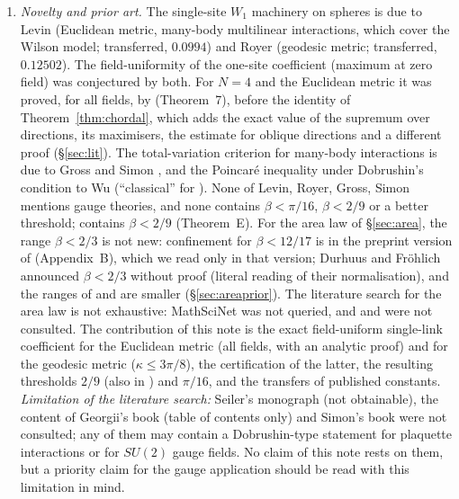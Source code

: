 \documentclass[11pt,a4paper]{article}
\theoremstyle{remark}
\theoremstyle{definition}
\theoremstyle{plain}
\theoremstyle{remark}
\begin{document}
\begin{enumerate}
This is not a refereeing: neither certificate, and none of the proofs, has been audited or refereed by a party outside the project, and the new proofs (\S\ref{sec:chordal}, \S\ref{sec:area}) have not been read by a human referee.
\item \emph{Novelty and prior art.} The single-site $W_1$ machinery on spheres is due to Levin \cite{Lev80}
(Euclidean metric, many-body multilinear interactions, which cover the Wilson model; transferred, $0.0994$)
and Royer \cite{Roy86} (geodesic metric; transferred, $0.12502$). The field-uniformity of the one-site
coefficient (maximum at zero field) was conjectured by both. For $N=4$ and the Euclidean metric it was proved, for all fields, by \cite{BB26} (Theorem~7),
before the identity of Theorem~\ref{thm:chordal}, which adds the exact value of the supremum over directions, its maximisers, the estimate for oblique directions and a different proof (\S\ref{sec:lit}).
The total-variation criterion for many-body interactions is due to Gross \cite{Gro79} and Simon \cite{Sim79}, and the Poincar\'e inequality under Dobrushin's condition to Wu \cite{Wu06} (``classical'' for \cite{BB26}).
None of Levin, Royer, Gross, Simon mentions gauge theories, and none contains $\beta<\pi/16$, $\beta<2/9$ or a better threshold; \cite{BB26} contains $\beta<2/9$ (Theorem~E).
For the area law of \S\ref{sec:area}, the range $\beta<2/3$ is not new: confinement for $\beta<12/17$ is in the preprint version of \cite{BS83} (Appendix~B), which we read only in that version; Durhuus and Fr\"ohlich \cite{DF80} announced $\beta<2/3$ without proof (literal reading of their normalisation), and the ranges of \cite{Fro79,ABF87} and \cite{CNS25} are smaller (\S\ref{sec:areaprior}). The literature search for the area law is not exhaustive: MathSciNet was not queried, and \cite{BGDF86} and \cite{Sei82} were not consulted.
The contribution of this note is the exact field-uniform single-link coefficient for the Euclidean metric (all fields, with an analytic proof) and for the geodesic metric ($\kappa\le3\pi/8$), the certification of the latter,
the resulting thresholds $2/9$ (also in \cite{BB26}) and $\pi/16$, and the transfers of published constants.
\emph{Limitation of the literature search:} Seiler's monograph \cite{Sei82} (not obtainable), the content of
Georgii's book \cite{Geo88} (table of contents only) and Simon's book \cite{Sim93} were not consulted; any of them
may contain a Dobrushin-type statement for plaquette interactions or for $SU(2)$ gauge fields. No claim of this
note rests on them, but a priority claim for the gauge application should be read with this limitation in mind.

\end{enumerate}
\end{document}

